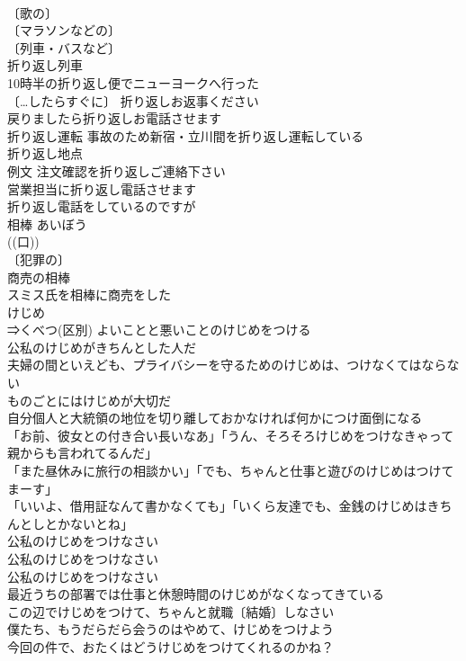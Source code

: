 \documentclass[8pt]{extreport}
\begin{document}
\begin{CJK}{UTF8}{min}
\\	〔歌の〕
\\	〔マラソンなどの〕
\\	〔列車・バスなど〕
\\	折り返し列車 
\\	10時半の折り返し便でニューヨークへ行った 
\\	〔…したらすぐに〕 折り返しお返事ください 
\\	戻りましたら折り返しお電話させます 
\\	折り返し運転 事故のため新宿・立川間を折り返し運転している 
\\	折り返し地点 
\\	例文 注文確認を折り返しご連絡下さい 
\\	営業担当に折り返し電話させます 
\\	折り返し電話をしているのですが 
\\	相棒	あいぼう	
\\	((口)) 
\\	〔犯罪の〕
\\	商売の相棒 
\\	スミス氏を相棒に商売をした 
\\	けじめ		
\\	⇒くべつ(区別) よいことと悪いことのけじめをつける 
\\	公私のけじめがきちんとした人だ 
\\	夫婦の間といえども、プライバシーを守るためのけじめは、つけなくてはならない 
\\	ものごとにはけじめが大切だ 
\\	自分個人と大統領の地位を切り離しておかなければ何かにつけ面倒になる 
\\	「お前、彼女との付き合い長いなあ」「うん、そろそろけじめをつけなきゃって親からも言われてるんだ」 
\\	「また昼休みに旅行の相談かい」「でも、ちゃんと仕事と遊びのけじめはつけてまーす」 
\\	「いいよ、借用証なんて書かなくても」「いくら友達でも、金銭のけじめはきちんとしとかないとね」 
\\	公私のけじめをつけなさい 
\\	公私のけじめをつけなさい 
\\	公私のけじめをつけなさい 
\\	最近うちの部署では仕事と休憩時間のけじめがなくなってきている 
\\	この辺でけじめをつけて、ちゃんと就職〔結婚〕しなさい 
\\	僕たち、もうだらだら会うのはやめて、けじめをつけよう 
\\	今回の件で、おたくはどうけじめをつけてくれるのかね？ 

\end{CJK}
\end{document}
